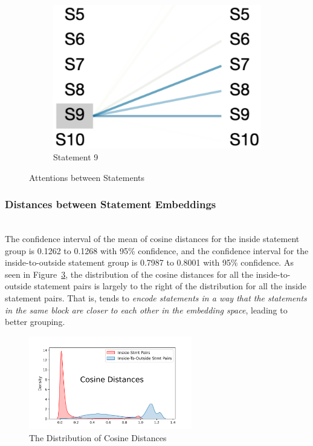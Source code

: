 \begin{figure}
\begin{subfigure}[b]{0.15\textwidth}
         \includegraphics[width=\textwidth]{sec9-fig3.png}
         \caption{Statement 9}
         \label{fig:stmt-9}
     \end{subfigure}
        \caption{Attentions between Statements}
        \label{fig:rq4-attention}
\end{figure}


\subsubsection{Distances between Statement Embeddings}~\\
The confidence interval of the mean of cosine distances for the inside
statement group is 0.1262 to 0.1268 with 95\% confidence, and the
confidence interval for the inside-to-outside statement group is
0.7987 to 0.8001 with 95\% confidence. As seen in
Figure~\ref{fig:rq4-density}, the distribution of the cosine distances
for all the inside-to-outside statement pairs is largely to the right
of the distribution for all the inside statement pairs. That is,
{\tool} tends to {\em encode statements in a way that the statements
  in the same  block are closer to each other in the
  embedding space}, leading to better grouping.
  
\begin{figure}[t]
 	\centering
 	\includegraphics[width=2.8in]{rq4-density-v2.png}
        \vspace{-12pt}
 	\caption{The Distribution of Cosine Distances}
 	\label{fig:rq4-density}	
\end{figure}




